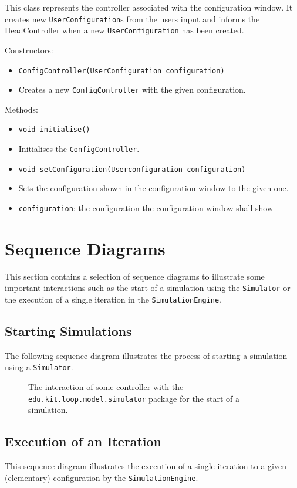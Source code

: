 \documentclass[parskip=full,11pt]{scrartcl}
\begin{document}
This class represents the controller associated with the configuration window. It creates new \texttt{UserConfiguration}s from the users input and informs the HeadController when a new \texttt{UserConfiguration} has been created.

Constructors:
\begin{itemize}\itemsep -10pt
	\item \texttt{ConfigController(UserConfiguration configuration)}
	\item[] Creates a new \texttt{ConfigController} with the given configuration.
\end{itemize}

Methods:
\begin{itemize}\itemsep -10pt
	\item \texttt{void initialise()}
	\item[] Initialises the \texttt{ConfigController}.
	
	\item \texttt{void setConfiguration(Userconfiguration configuration)}
	\item[] Sets the configuration shown in the configuration window to the given one.
	\item[] \texttt{configuration}: the configuration the configuration window shall show
	
\end{itemize}

\section{Sequence Diagrams}
This section contains a selection of sequence diagrams to illustrate some important interactions such as the start of a simulation using the \texttt{Simulator} or the execution of a single iteration in the \texttt{SimulationEngine}.

\subsection{Starting Simulations}
The following sequence diagram illustrates the process of starting a simulation using a \texttt{Simulator}.
\iftrue
\begin{figure}[h]
	\centering
	\fontsize{5.25}{8}\selectfont
	
	\caption{The interaction of some controller with the \texttt{edu.kit.loop.model.simulator} package for the start of a simulation.}
\end{figure}
\fi
\subsection{Execution of an Iteration}
This sequence diagram illustrates the execution of a single iteration to a given (elementary) configuration by the \texttt{SimulationEngine}.
\end{document}
